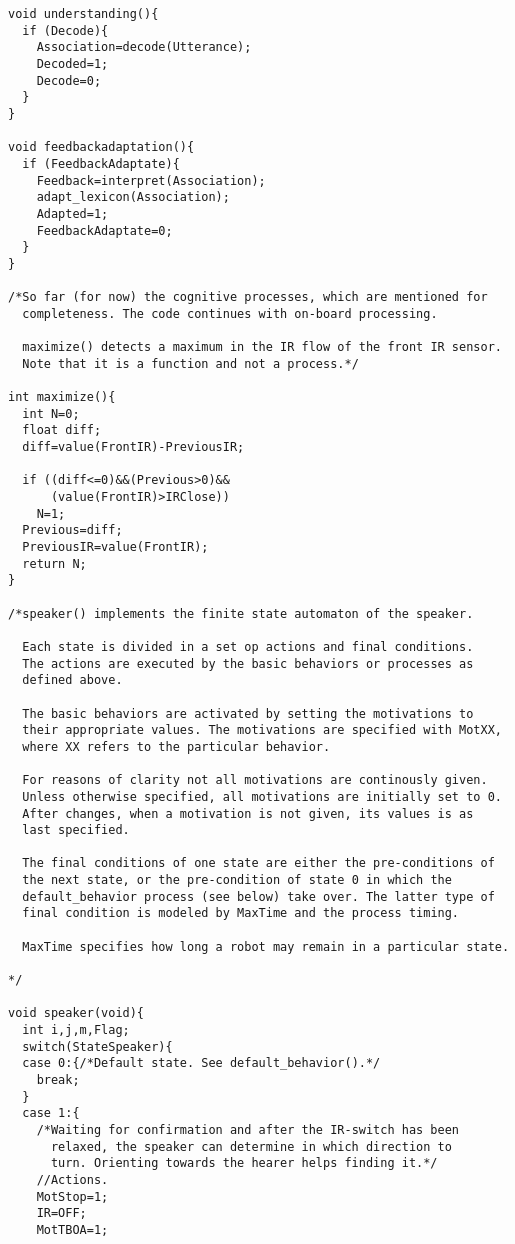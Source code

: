 {\begin{verbatim}
void understanding(){
  if (Decode){
    Association=decode(Utterance);
    Decoded=1;
    Decode=0;
  }
}

void feedbackadaptation(){
  if (FeedbackAdaptate){
    Feedback=interpret(Association);
    adapt_lexicon(Association);
    Adapted=1;
    FeedbackAdaptate=0;
  }
}

/*So far (for now) the cognitive processes, which are mentioned for
  completeness. The code continues with on-board processing.

  maximize() detects a maximum in the IR flow of the front IR sensor.
  Note that it is a function and not a process.*/

int maximize(){
  int N=0;
  float diff;
  diff=value(FrontIR)-PreviousIR;
  
  if ((diff<=0)&&(Previous>0)&&
      (value(FrontIR)>IRClose))
    N=1;
  Previous=diff;
  PreviousIR=value(FrontIR);
  return N;
}

/*speaker() implements the finite state automaton of the speaker.

  Each state is divided in a set op actions and final conditions.
  The actions are executed by the basic behaviors or processes as 
  defined above.

  The basic behaviors are activated by setting the motivations to 
  their appropriate values. The motivations are specified with MotXX, 
  where XX refers to the particular behavior.

  For reasons of clarity not all motivations are continously given.
  Unless otherwise specified, all motivations are initially set to 0.
  After changes, when a motivation is not given, its values is as
  last specified.

  The final conditions of one state are either the pre-conditions of
  the next state, or the pre-condition of state 0 in which the 
  default_behavior process (see below) take over. The latter type of
  final condition is modeled by MaxTime and the process timing.
  
  MaxTime specifies how long a robot may remain in a particular state.

*/

void speaker(void){
  int i,j,m,Flag;
  switch(StateSpeaker){	
  case 0:{/*Default state. See default_behavior().*/
    break;
  }
  case 1:{
    /*Waiting for confirmation and after the IR-switch has been 
      relaxed, the speaker can determine in which direction to 
      turn. Orienting towards the hearer helps finding it.*/
    //Actions.
    MotStop=1;
    IR=OFF;
    MotTBOA=1;
    

\end{verbatim}}
